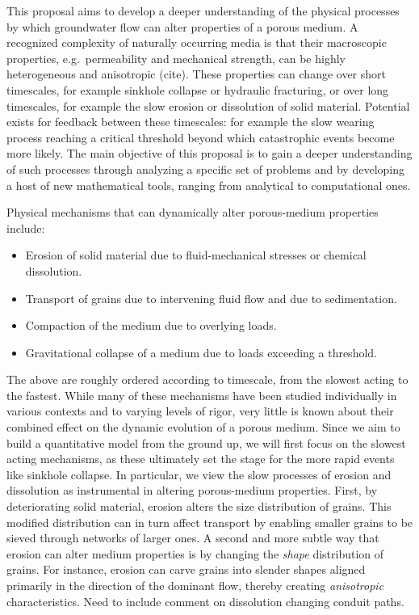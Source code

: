 \documentclass[12pt]{article}
\begin{document}
This proposal aims to develop a deeper understanding of the physical processes by which groundwater flow can alter properties of a porous medium. A recognized complexity of naturally occurring media is that their macroscopic properties, e.g.~permeability and mechanical strength, can be highly heterogeneous and anisotropic {\color{blue}(cite)}. These properties can change over short timescales, for example sinkhole collapse or hydraulic fracturing, or over long timescales, for example the slow erosion or dissolution of solid material. Potential exists for feedback between these timescales: for example the slow wearing process reaching a critical threshold beyond which catastrophic events become more likely. The main objective of this proposal is to gain a deeper understanding of such processes through analyzing a specific set of problems and by developing a host of new mathematical tools, ranging from analytical to computational ones.

Physical mechanisms that can dynamically alter porous-medium properties include:
\begin{itemize}
\item Erosion of solid material due to fluid-mechanical stresses or chemical dissolution.
\item Transport of grains due to intervening fluid flow and due to sedimentation.
\item Compaction of the medium due to overlying loads.
\item Gravitational collapse of a medium due to loads exceeding a threshold.
\end{itemize}
The above are roughly ordered according to timescale, from the slowest acting to the fastest. While many of these mechanisms have been studied individually in various contexts and to varying levels of rigor, very little is known about their combined effect on the dynamic evolution of a porous medium. Since we aim to build a quantitative model from the ground up, we will first focus on the slowest acting mechanisms, as these ultimately set the stage for the more rapid events like sinkhole collapse. 
In particular, we view the slow processes of erosion and dissolution as instrumental in altering porous-medium properties. First, by deteriorating solid material, erosion alters the size distribution of grains. This modified distribution can in turn affect transport by enabling smaller grains to be sieved through networks of larger ones. A second and more subtle way that erosion can alter medium properties is by changing the {\em shape} distribution of grains. For instance, erosion can carve grains into slender shapes aligned primarily in the direction of the dominant flow, thereby creating {\em anisotropic} characteristics. {\color{blue} Need to include comment on dissolution changing conduit paths.}
\end{document}
